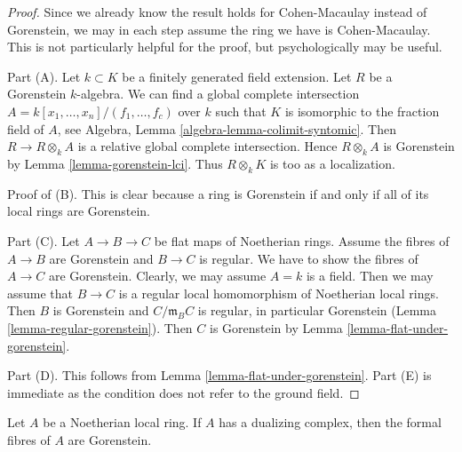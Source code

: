 \begin{proof}
Since we already know the result holds for Cohen-Macaulay instead
of Gorenstein, we may in each step assume the ring we have is
Cohen-Macaulay. This is not particularly helpful for the proof, but
psychologically may be useful.

\medskip\noindent
Part (A). Let $k \subset K$ be a finitely generated field extension.
Let $R$ be a Gorenstein $k$-algebra.
We can find a global complete intersection
$A = k[x_1, \ldots, x_n]/(f_1, \ldots, f_c)$
over $k$ such that $K$ is isomorphic to the fraction field of $A$, see
Algebra, Lemma \ref{algebra-lemma-colimit-syntomic}.
Then $R \to R \otimes_k A$ is a relative global complete intersection.
Hence $R \otimes_k A$ is Gorenstein by Lemma \ref{lemma-gorenstein-lci}.
Thus $R \otimes_k K$ is too as a localization.

\medskip\noindent
Proof of (B). This is clear because a ring is Gorenstein
if and only if all of its local rings are Gorenstein.

\medskip\noindent
Part (C). Let $A \to B \to C$ be flat maps of Noetherian rings.
Assume the fibres of $A \to B$ are Gorenstein and $B \to C$ is regular.
We have to show the fibres of $A \to C$ are Gorenstein.
Clearly, we may assume $A = k$ is a field. Then we may assume that
$B \to C$ is a regular local homomorphism of Noetherian local rings.
Then $B$ is Gorenstein and $C/\mathfrak m_B C$ is regular, in
particular Gorenstein (Lemma \ref{lemma-regular-gorenstein}).
Then $C$ is Gorenstein by
Lemma \ref{lemma-flat-under-gorenstein}.

\medskip\noindent
Part (D). This follows from Lemma \ref{lemma-flat-under-gorenstein}.
Part (E) is immediate as the condition does not refer to the ground field.
\end{proof}

\begin{lemma}
\label{lemma-dualizing-gorenstein-formal-fibres}
Let $A$ be a Noetherian local ring. If $A$ has a dualizing complex,
then the formal fibres of $A$ are Gorenstein.
\end{lemma}

